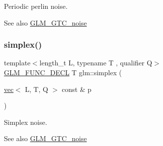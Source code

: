 Periodic perlin noise. \begin{DoxySeeAlso}{See also}
\mbox{\hyperlink{group__gtc__noise}{G\+L\+M\+\_\+\+G\+T\+C\+\_\+noise}} 
\end{DoxySeeAlso}
\mbox{\label{group__gtc__noise_ga8122468c69015ff397349a7dcc638b27}} 
\subsubsection{\texorpdfstring{simplex()}{simplex()}}
{\footnotesize\ttfamily template$<$length\+\_\+t L, typename T , qualifier Q$>$ \\
\mbox{\hyperlink{setup_8hpp_ab2d052de21a70539923e9bcbf6e83a51}{G\+L\+M\+\_\+\+F\+U\+N\+C\+\_\+\+D\+E\+CL}} T glm\+::simplex (\begin{DoxyParamCaption}\item[{\mbox{\hyperlink{structglm_1_1vec}{vec}}$<$ L, T, Q $>$ const \&}]{p }\end{DoxyParamCaption})}

Simplex noise. \begin{DoxySeeAlso}{See also}
\mbox{\hyperlink{group__gtc__noise}{G\+L\+M\+\_\+\+G\+T\+C\+\_\+noise}} 
\end{DoxySeeAlso}
